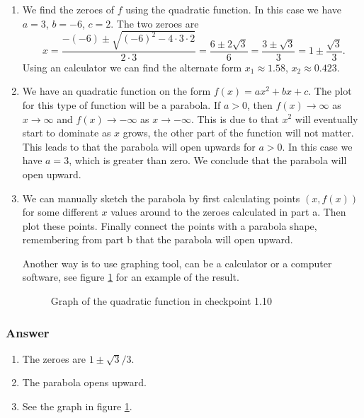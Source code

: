 \begin{enumerate}[label = (\alph*)]
  \item
    We find the zeroes of $ f $ using the quadratic function. In this case we have $ a = 3 $, $ b = -6 $, $ c = 2 $. The two zeroes are
    $$ \phantom{.}
    x = \frac{-(-6) \pm \sqrt{(-6)^2 - 4 \cdot 3 \cdot 2}}{2 \cdot 3} = \frac{6 \pm 2\sqrt{3}}{6} = \frac{3 \pm \sqrt{3}}{3} = 1 \pm \frac{\sqrt{3}}{3}
    .$$
    Using an calculator we can find the alternate form $ x_1 \approx 1.58 $, $ x_2 \approx 0.423 $.
  \item
    We have an quadratic function on the form $ f(x) = ax^2 + bx + c $. The plot for this type of function will be a parabola. If $ a > 0 $, then $ f(x) \to \infty $ as $ x \to \infty $ and $ f(x) \to -\infty $ as $ x \to -\infty $. This is due to that $ x^2 $ will eventually start to dominate as $ x $ grows, the other part of the function will not matter. This leads to that the parabola will open upwards for $ a > 0 $. In this case we have $ a = 3 $, which is greater than zero. We conclude that the parabola will open upward.
  \item
    We can manually sketch the parabola by first calculating points $ (x, f(x)) $ for some different $ x $ values around to the zeroes calculated in part a. Then plot these points. Finally connect the points with a parabola shape, remembering from part b that the parabola will open upward.

    Another way is to use graphing tool, can be a calculator or a computer software, see figure \ref{figure:checkpoint-1.10} for an example of the result.

    \begin{figure}[H]
      \centering
      \caption{Graph of the quadratic function in checkpoint 1.10}
      \label{figure:checkpoint-1.10}
    \end{figure}
\end{enumerate}

\subsubsection{Answer}

\begin{enumerate}[label = (\alph*)]
  \item
    The zeroes are $ 1 \pm {\sqrt{3}}/3 $.
  \item
    The parabola opens upward.
  \item See the graph in figure \ref{figure:checkpoint-1.10}.
\end{enumerate}
